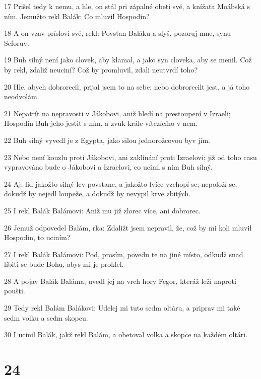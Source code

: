 \par 17 Prišel tedy k nemu, a hle, on stál pri zápalné obeti své, a knížata Moábská s ním. Jemužto rekl Balák: Co mluvil Hospodin?
\par 18 A on vzav prísloví své, rekl: Povstan Baláku a slyš, pozoruj mne, synu Seforuv.
\par 19 Buh silný není jako clovek, aby klamal, a jako syn cloveka, aby se menil. Což by rekl, zdaliž neuciní? Což by promluvil, zdali neutvrdí toho?
\par 20 Hle, abych dobrorecil, prijal jsem to na sebe; nebo dobrorecilt jest, a já toho neodvolám.
\par 21 Nepatrít na nepravosti v Jákobovi, aniž hledí na prestoupení v Izraeli; Hospodin Buh jeho jestit s ním, a zvuk krále vítezícího v nem.
\par 22 Buh silný vyvedl je z Egypta, jako silou jednorožcovou byv jim.
\par 23 Nebo není kouzlu proti Jákobovi, ani zaklínání proti Izraelovi; již od toho casu vypravováno bude o Jákobovi a Izraelovi, co ucinil s ním Buh silný.
\par 24 Aj, lid jakožto silný lev povstane, a jakožto lvíce vzchopí se; nepoloží se, dokudž by nejedl loupeže, a dokudž by nevypil krve zbitých.
\par 25 I rekl Balák Balámovi: Aniž mu již zlorec více, ani dobrorec.
\par 26 Jemuž odpovedel Balám, rka: Zdaližt jsem nepravil, že, což by mi koli mluvil Hospodin, to uciním?
\par 27 I rekl Balák Balámovi: Pod, prosím, povedu te na jiné místo, odkudž snad líbiti se bude Bohu, abys mi je proklel.
\par 28 A pojav Balák Baláma, uvedl jej na vrch hory Fegor, kteráž leží naproti poušti.
\par 29 Tedy rekl Balám Balákovi: Udelej mi tuto sedm oltáru, a priprav mi také sedm volku a sedm skopcu.
\par 30 I ucinil Balák, jakž rekl Balám, a obetoval volka a skopce na každém oltári.

\chapter{24}


